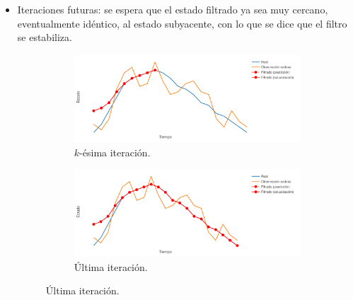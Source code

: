 \begin{itemize}
\begin{figure}[h!]
    \end{figure}
    \item Iteraciones futuras: se espera que el estado filtrado ya sea muy cercano, eventualmente idéntico, al estado subyacente, con lo que se dice que el filtro se estabiliza.
    \begin{figure}[h!]
        \centering
        \begin{subfigure}[b]{.49\linewidth}
        \centering
            \includegraphics[width=\linewidth]{img/content/chapter2/filt25.pdf}
            \caption{$k$-ésima iteración.}
        \end{subfigure}
        \begin{subfigure}[b]{.49\linewidth}
        \centering
            \includegraphics[width=\linewidth]{img/content/chapter2/filt26.pdf}
            \caption{Última iteración.}
        \end{subfigure}
    \end{figure}
\end{itemize}


